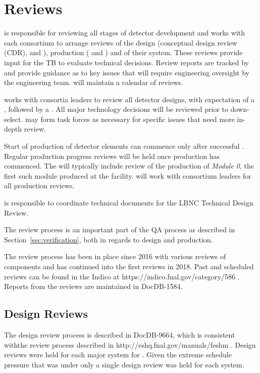 \chapter{Reviews}
\label{vl:tc-review}

 is responsible for reviewing all stages of detector
development and works with each consortium to arrange reviews of the
design (conceptual design review (CDR),  and ),
production ( and ) and  of their
system.  These reviews provide input for the TB to evaluate technical
decisions.  Review reports are tracked by  and provide
guidance as to key issues that will require engineering oversight by
the  engineering team.  will maintain a calendar
of  reviews.

 works with consortia leaders to review all detector designs,
with expectation of a , followed by a .  All
major technology decisions will be reviewed prior to down-select.  
may form task forces as necessary for specific issues that need more
in-depth review.


Start of production of detector elements can commence only after
successful . Regular production progress
reviews will be held once production has commenced. The 
will typically include review of the production of \textit{Module 0}, the
first such module produced at the facility.  will work with
consortium leaders for all production reviews.

 is responsible to coordinate technical documents for the LBNC
Technical Design Review.

The review process is an important part of the  QA process
as described in Section~\ref{sec:verification}, both in regards to
design and production.

The review process has been in place since 2016 with various reviews
of  components and has continued into the first 
reviews in 2018. Past and scheduled reviews can be found in the
 Indico at https://indico.fnal.gov/category/586 .
Reports from the reviews are maintained in DocDB-1584.

\section{Design Reviews}

The  design review process is described in DocDB-9664,
which is consistent withthe \fnal review process described in
http://eshq.fnal.gov/manuals/feshm . Design reviews were held for each
major system for . Given the extreme schedule
pressure that  was under only a single design review
was held for each system.


